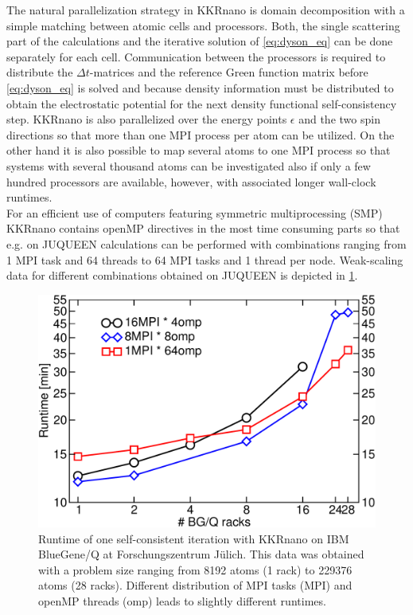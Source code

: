 \documentclass [a4paper, 12pt]{article}
\begin{document}
The natural parallelization strategy in KKRnano is domain decomposition with a simple 
matching between atomic cells and processors. Both, the single scattering part of the 
calculations and the iterative solution of \cref{eq:dyson_eq} can be done separately for each cell. 
Communication between the processors is required to distribute the
$\Delta t$-matrices and the 
reference Green function matrix
before \cref{eq:dyson_eq} is solved and because density information
must be distributed to obtain the electrostatic potential for the next density functional
self-consistency step. KKRnano is also parallelized over the energy points $\epsilon$ and 
the two spin directions so that more than one MPI process per atom can be utilized.
On the other hand it is also possible to map several atoms to one MPI process so that
systems with several thousand atoms can be investigated also if only a few hundred
processors are available, however, with associated longer wall-clock runtimes.
\\
For an efficient use of computers featuring symmetric multiprocessing (SMP) KKRnano contains openMP directives
in the most time consuming parts so that e.g. on JUQUEEN calculations can be performed with combinations 
ranging from 1 MPI task and 64 threads to 64 MPI tasks and 1 thread per node. Weak-scaling data
for different combinations
obtained on JUQUEEN is depicted in \cref{fig:total_runtimes}.
\begin{figure}[h]
\begin{center}
 \includegraphics[scale=0.45]{Figures/total_runtimes.pdf}
\end{center}
\caption{Runtime of one self-consistent iteration with KKRnano 
	on IBM BlueGene/Q at Forschungszentrum J{\"u}lich.
	This data was obtained with a problem size ranging from 8192 atoms (1 rack) to 229376 atoms (28 racks).
	Different distribution of MPI tasks (MPI) and openMP threads (omp) leads to slightly different runtimes.}
\label{fig:total_runtimes}
\end{figure}
\end{document}
